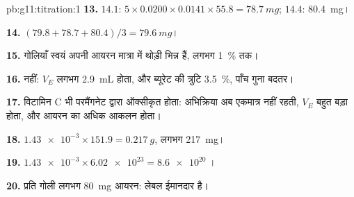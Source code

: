 \begin{solution}{pb:g11:titration:1}
\textbf{13.} $14.1$: $5 \times 0.0200 \times 0.0141 \times 55.8 =
\qty{78.7}{mg}$; $14.4$: \qty{80.4}{mg}।

\textbf{14.} $(79.8 + 78.7 + 80.4)/3 = \qty{79.6}{mg}$।

\textbf{15.} गोलियाँ स्वयं अपनी आयरन मात्रा में थोड़ी भिन्न हैं,
लगभग \qty{1}{\percent} तक।

\textbf{16.} नहीं: $V_E$ लगभग \qty{2.9}{mL} होता, और ब्यूरेट की
त्रुटि \qty{3.5}{\percent}, पाँच गुना बदतर।

\textbf{17.} विटामिन C भी परमैंगनेट द्वारा ऑक्सीकृत होता: अभिक्रिया
अब एकमात्र नहीं रहती, $V_E$ बहुत बड़ा होता, और
आयरन का अधिक आकलन होता।

\textbf{18.} $\num{1.43e-3} \times 151.9 = \qty{0.217}{g}$, लगभग
\qty{217}{mg}।

\textbf{19.} $\num{1.43e-3} \times \num{6.02e23} = \num{8.6e20}$ ।

\textbf{20.} प्रति गोली लगभग \qty{80}{mg} आयरन: लेबल
ईमानदार है।
\end{solution}
